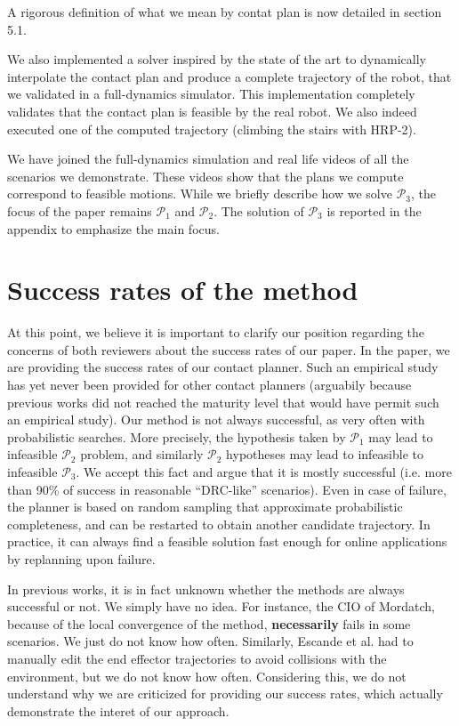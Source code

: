 \documentclass[12pt]{article}
\begin{document}
A rigorous definition of what we mean by contat plan is now detailed in section 5.1. 


We also implemented a solver inspired by the state of the art to dynamically interpolate the contact plan and produce a complete trajectory of the robot, that we validated in a full-dynamics simulator. 
This implementation completely validates that the contact plan is feasible by the real robot.
We also indeed executed one of the computed trajectory (climbing the stairs with HRP-2).

We have joined the full-dynamics simulation and real life videos of all the scenarios we demonstrate.
These videos show that the plans we compute correspond to feasible motions.
While we briefly describe how we solve $\mathcal{P}_3$, the focus of the paper remains $\mathcal{P}_1$ and $\mathcal{P}_2$. 
The solution of $\mathcal{P}_3$ is reported in the appendix to emphasize the main focus.

\newcommand{\mP}[1]{$\mathcal{P}_#1$}

\section{Success rates of the method}
At this point, we believe it is important to clarify our position regarding the concerns of both reviewers about the success rates of our paper.
In the paper, we are providing the success rates of our contact planner. 
Such an empirical study has yet never been provided for other contact planners (arguabily because previous works did not reached the maturity level that would have permit such an empirical study).
Our method is not always successful, as very often with probabilistic searches.
More precisely, the hypothesis taken by \mP1 may lead to infeasible \mP2 problem, and similarly \mP2 hypotheses may lead to infeasible to infeasible \mP3.
We accept this fact and argue that it is mostly successful (i.e. more than 90\% of success in reasonable ``DRC-like'' scenarios).
Even in case of failure, the planner is based on random sampling that approximate probabilistic completeness, and can be restarted to obtain another candidate trajectory.
In practice, it can always find a feasible solution fast enough for online applications by replanning upon failure.

In previous works, it is in fact unknown whether the methods are always successful or not. We simply have no idea. For instance, the CIO of Mordatch,
because of the local convergence of the method, \textbf{necessarily} fails in some scenarios. We just do not know how often. Similarly, Escande et al. had to manually edit 
the end effector trajectories to avoid collisions with the environment, but we do not know how often. Considering this,
we do not understand why we are criticized for providing our success rates, which actually demonstrate the interet of our approach.
\end{document}
